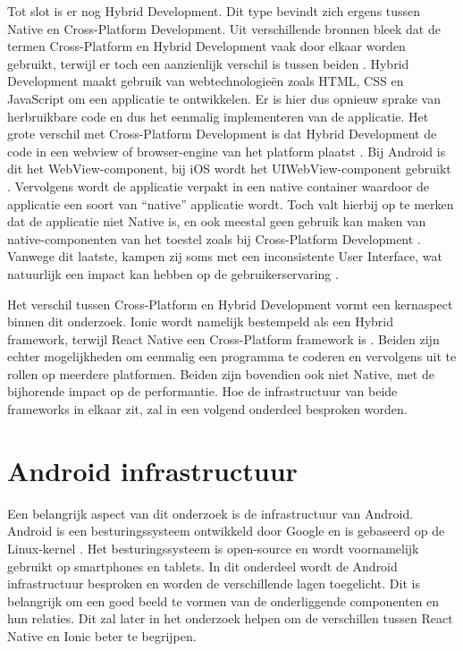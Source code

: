 Tot slot is er nog Hybrid Development. Dit type bevindt zich ergens tussen Native en Cross-Platform Development. Uit verschillende bronnen bleek dat de termen Cross-Platform en Hybrid Development vaak door elkaar worden gebruikt, terwijl er toch een aanzienlijk verschil is tussen beiden \autocite{Bron1, Bron11, Bron12}. Hybrid Development maakt gebruik van webtechnologieën zoals HTML, CSS en JavaScript om een applicatie te ontwikkelen. Er is hier dus opnieuw sprake van herbruikbare code en dus het eenmalig implementeren van de applicatie. Het grote verschil met Cross-Platform Development is dat Hybrid Development de code in een webview of browser-engine van het platform plaatst \autocite{Bron11, Bron1}. Bij Android is dit het WebView-component, bij iOS wordt het UIWebView-component gebruikt \autocite{Bron4}. Vervolgens wordt de applicatie verpakt in een native container waardoor de applicatie een soort van ``native'' applicatie wordt. Toch valt hierbij op te merken dat de applicatie niet Native is, en ook meestal geen gebruik kan maken van native-componenten van het toestel zoals bij Cross-Platform Development \autocite{Bron12, Bron6}. Vanwege dit laatste, kampen zij soms met een inconsistente User Interface, wat natuurlijk een impact kan hebben op de gebruikerservaring \autocite{Bron12}.

Het verschil tussen Cross-Platform en Hybrid Development vormt een kernaspect binnen dit onderzoek. Ionic wordt namelijk bestempeld als een Hybrid framework, terwijl React Native een Cross-Platform framework is \autocite{Bron4, Bron1}. Beiden zijn echter mogelijkheden om eenmalig een programma te coderen en vervolgens uit te rollen op meerdere platformen. Beiden zijn bovendien ook niet Native, met de bijhorende impact op de performantie. Hoe de infrastructuur van beide frameworks in elkaar zit, zal in een volgend onderdeel besproken worden.


\section{Android infrastructuur}
\label{sec:android-infrastructuur}

Een belangrijk aspect van dit onderzoek is de infrastructuur van Android. Android is een besturingssysteem ontwikkeld door Google en is gebaseerd op de Linux-kernel \autocite{Bron13}. Het besturingssysteem is open-source en wordt voornamelijk gebruikt op smartphones en tablets. In dit onderdeel wordt de Android infrastructuur besproken en worden de verschillende lagen toegelicht. Dit is belangrijk om een goed beeld te vormen van de onderliggende componenten en hun relaties. Dit zal later in het onderzoek helpen om de verschillen tussen React Native en Ionic beter te begrijpen.

